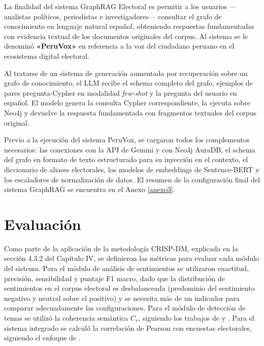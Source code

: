 La finalidad del sistema GraphRAG Electoral es permitir a los usuarios —analistas
políticos, periodistas e investigadores— consultar el grafo de conocimiento en lenguaje
natural español, obteniendo respuestas fundamentadas con evidencia textual de los
documentos originales del corpus. Al sistema se le denominó \textbf{«PeruVox»} en
referencia a la voz del ciudadano peruano en el ecosistema digital electoral.

Al tratarse de un sistema de generación aumentada por recuperación sobre un grafo
de conocimiento, el LLM recibe el schema completo del grafo, ejemplos de pares
pregunta-Cypher en modalidad \textit{few-shot} y la pregunta del usuario en español.
El modelo genera la consulta Cypher correspondiente, la ejecuta sobre Neo4j y devuelve
la respuesta fundamentada con fragmentos textuales del corpus original.

Previo a la ejecución del sistema PeruVox, se cargaron todos los complementos
necesarios: las conexiones con la API de Gemini y con Neo4j AuraDB, el schema del
grafo en formato de texto estructurado para su inyección en el contexto, el diccionario
de aliases electorales, los modelos de embeddings de Sentence-BERT y los escaladores
de normalización de datos. El resumen de la configuración final del sistema GraphRAG
se encuentra en el Anexo \ref{anexo3}.

\section{Evaluación}

Como parte de la aplicación de la metodología CRISP-DM, explicada en la sección 4.3.2
del Capítulo IV, se definieron las métricas para evaluar cada módulo del sistema. Para
el módulo de análisis de sentimientos se utilizaron exactitud, precisión, sensibilidad
y puntaje F1 macro, dado que la distribución de sentimientos en el corpus electoral
es desbalanceada (predominio del sentimiento negativo y neutral sobre el positivo) y se
necesita más de un indicador para comparar adecuadamente las configuraciones. Para el
módulo de detección de temas se utilizó la coherencia semántica $C_v$, siguiendo los
trabajos de \cite{pr_mendonca2025bertopic_political} y \cite{pr_janssens2025bertopic_llm}.
Para el sistema integrado se calculó la correlación de Pearson con encuestas electorales,
siguiendo el enfoque de \cite{pr_gujral2024llm_elections}.


